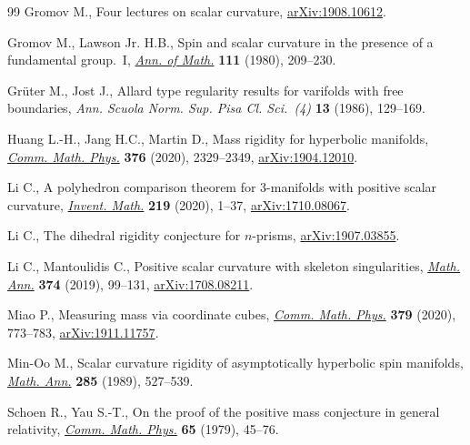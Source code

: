 \documentclass[pdftex]{sigma}
\numberwithin{equation}{section}
\theoremstyle{definition}
\begin{document}
\begin{thebibliography}{99}
Gromov M., Four lectures on scalar curvature, \href{https://arxiv.org/abs/1908.10612}{arXiv:1908.10612}.

Gromov M., Lawson Jr. H.B., Spin and scalar curvature in the presence of a
 fundamental group.~{I}, \href{https://doi.org/10.2307/1971198}{\textit{Ann. of Math.}} \textbf{111} (1980), 209--230.

Gr\"uter M., Jost J., Allard type regularity results for varifolds with free
 boundaries, \textit{Ann. Scuola Norm. Sup. Pisa Cl. Sci.~(4)} \textbf{13}
 (1986), 129--169.

Huang L.-H., Jang H.C., Martin D., Mass rigidity for hyperbolic manifolds,
 \href{https://doi.org/10.1007/s00220-019-03623-0}{\textit{Comm. Math. Phys.}} \textbf{376} (2020), 2329--2349,
 \href{https://arxiv.org/abs/1904.12010}{arXiv:1904.12010}.

Li C., A polyhedron comparison theorem for 3-manifolds with positive scalar
 curvature, \href{https://doi.org/10.1007/s00222-019-00895-0}{\textit{Invent. Math.}} \textbf{219} (2020), 1--37,
 \href{https://arxiv.org/abs/1710.08067}{arXiv:1710.08067}.

Li C., The dihedral rigidity conjecture for $n$-prisms, \href{https://arxiv.org/abs/1907.03855}{arXiv:1907.03855}.

Li C., Mantoulidis C., Positive scalar curvature with skeleton singularities,
 \href{https://doi.org/10.1007/s00208-018-1753-1}{\textit{Math. Ann.}} \textbf{374} (2019), 99--131, \href{https://arxiv.org/abs/1708.08211}{arXiv:1708.08211}.

Miao P., Measuring mass via coordinate cubes, \href{https://doi.org/10.1007/s00220-020-03811-3}{\textit{Comm. Math. Phys.}}
 \textbf{379} (2020), 773--783, \href{https://arxiv.org/abs/1911.11757}{arXiv:1911.11757}.

Min-Oo M., Scalar curvature rigidity of asymptotically hyperbolic spin
 manifolds, \href{https://doi.org/10.1007/BF01452046}{\textit{Math. Ann.}} \textbf{285} (1989), 527--539.

Schoen R., Yau S.-T., On the proof of the positive mass conjecture in general
 relativity, \href{https://doi.org/10.1007/BF01940959}{\textit{Comm. Math. Phys.}} \textbf{65} (1979), 45--76.


\end{thebibliography}
\end{document}
